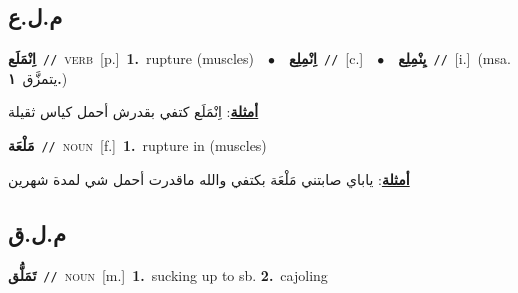 \documentclass[10pt,a4paper,twoside]{article} %
\begin{document}
\begin{multicols}{2}
\vspace{-3mm}
\subsection*{\color{blue}\foreignlanguage{arabic}{م.ل.ع}\color{blue}{}} 

{\setlength\topsep{0pt}\textbf{\foreignlanguage{arabic}{اِنْمَلَع}}\ {\color{gray}\texttt{//}\color{black}}\ \textsc{verb}\ [p.]\ \textbf{1.}~rupture (muscles)\ \ $\bullet$\ \ \setlength\topsep{0pt}\textbf{\foreignlanguage{arabic}{اِنْمِلِع}}\ {\color{gray}\texttt{//}\color{black}}\ [c.]\ \ $\bullet$\ \ \setlength\topsep{0pt}\textbf{\foreignlanguage{arabic}{يِنْمِلِع}}\ {\color{gray}\texttt{//}\color{black}}\ [i.]\ \color{gray}(msa. \foreignlanguage{arabic}{يتمزَّق}~\foreignlanguage{arabic}{\textbf{١.}})\color{black}\  \begin{flushright}\color{gray}\foreignlanguage{arabic}{\textbf{\underline{\foreignlanguage{arabic}{أمثلة}}}: اِنْمَلَع كتفي بقدرش أحمل كياس ثقيلة}\end{flushright}\color{black}} \vspace{2mm}

{\setlength\topsep{0pt}\textbf{\foreignlanguage{arabic}{مَلْعَة}}\ {\color{gray}\texttt{//}\color{black}}\ \textsc{noun}\ [f.]\ \textbf{1.}~rupture in (muscles)\  \begin{flushright}\color{gray}\foreignlanguage{arabic}{\textbf{\underline{\foreignlanguage{arabic}{أمثلة}}}: ياباي صابتني مَلْعَة بكتفي والله ماقدرت أحمل شي لمدة شهرين}\end{flushright}\color{black}} \vspace{2mm}

\vspace{-3mm}
\subsection*{\color{blue}\foreignlanguage{arabic}{م.ل.ق}\color{blue}{}} 

{\setlength\topsep{0pt}\textbf{\foreignlanguage{arabic}{تَمَلُّق}}\ {\color{gray}\texttt{//}\color{black}}\ \textsc{noun}\ [m.]\ \textbf{1.}~sucking up to sb.  \textbf{2.}~cajoling\ } \vspace{2mm}


\end{multicols}
\end{document}
